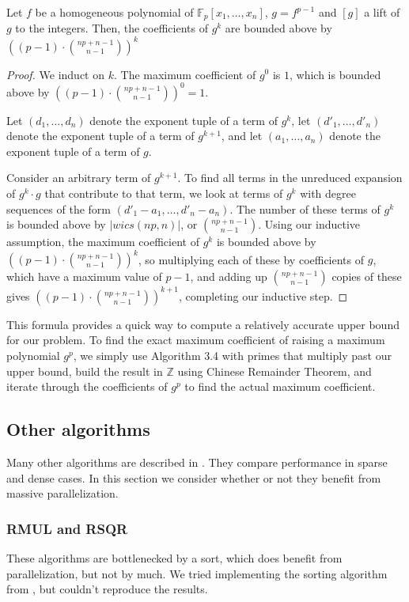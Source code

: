 \begin{thm}
    Let $f$ be a homogeneous polynomial of $\mathbb{F}_p[x_1, \dots, x_n]$, $g = f ^ {p - 1}$ and $[g]$ a lift of $g$ to the integers. Then, the coefficients of $g ^ k$ are bounded above by $((p - 1) \cdot \binom{np + n - 1}{n - 1}) ^ k$
\end{thm}

\begin{proof}
    We induct on $k$. The maximum coefficient of $g^0$ is $1$, which is bounded above by $((p - 1) \cdot \binom{np + n - 1}{n - 1}) ^ 0 = 1$.
    
    Let $(d_1, \dots , d_n)$ denote the exponent tuple of a term of $g^k$, let $(d'_1, \dots , d'_n)$ denote the exponent tuple of a term of $g^{k + 1}$, and let $(a_1, \dots , a_n)$ denote the exponent tuple of a term of $g$.

    Consider an arbitrary term of $g^{k + 1}$. To find all terms in the unreduced expansion of $g^k \cdot g$ that contribute to that term, we look at terms of $g^k$ with degree sequences of the form $(d'_1 - a_1, \dots , d'_n - a_n)$. The number of these terms of $g^k$ is bounded above by $|wics(np, n)|$, or $\binom{np + n - 1}{n - 1}$. Using our inductive assumption, the maximum coefficient of $g^k$ is bounded above by $((p - 1) \cdot \binom{np + n - 1}{n - 1}) ^ k$, so multiplying each of these by coefficients of $g$, which have a maximum value of $p - 1$, and adding up $\binom{np + n - 1}{n - 1}$ copies of these gives $((p - 1) \cdot \binom{np + n - 1}{n - 1}) ^ {k + 1}$, completing our inductive step.
\end{proof}

This formula provides a quick way to compute a relatively accurate upper bound for our problem. To find the exact maximum coefficient of raising a maximum polynomial $g ^ p$, we simply use Algorithm 3.4 with primes that multiply past our upper bound, build the result in $\mathbb{Z}$ using Chinese Remainder Theorem, and iterate through the coefficients of $g^p$ to find the actual maximum coefficient.

\subsection{Other algorithms}
Many other algorithms are described in \cite{monagan-2012-sparse-powering}. They compare performance in sparse and dense cases. In this section we consider whether or not they benefit from massive parallelization.

\subsubsection{RMUL and RSQR}
These algorithms are bottlenecked by a sort, which does benefit from parallelization, but not by much. We tried implementing the sorting algorithm from \cite{gupta-2023-gpu-sort}, but couldn't reproduce the results.

